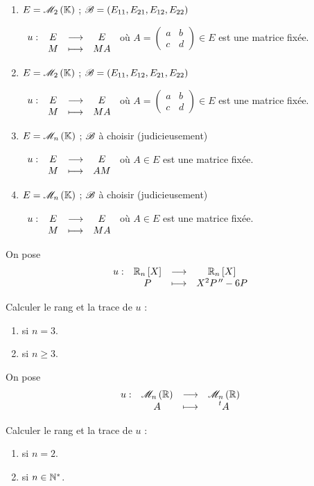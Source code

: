 \begin{exo}
\begin{enumerate}
\item \(E=\M{2}\) ; \(\mathscr{B}=\left(E_{11},E_{21},E_{12},E_{22}\right)\)

\(\begin{array}[t]{cccc}u : & E & \longrightarrow & E \\ & M & \longmapsto & MA\end{array}\) où \(A=\begin{pmatrix}
a & b \\
c & d
\end{pmatrix}\in E\) est une matrice fixée. \\

\item \(E=\M{2}\) ; \(\mathscr{B}=\left(E_{11},E_{12},E_{21},E_{22}\right)\)

\(\begin{array}[t]{cccc}u : & E & \longrightarrow & E \\ & M & \longmapsto & MA\end{array}\) où \(A=\begin{pmatrix}
a & b \\
c & d
\end{pmatrix}\in E\) est une matrice fixée. \\

\item \(E=\M{n}\) ; \(\mathscr{B}\) à choisir (judicieusement)

\(\begin{array}[t]{cccc}u : & E & \longrightarrow & E \\ & M & \longmapsto & AM\end{array}\) où \(A\in E\) est une matrice fixée. \\

\item \(E=\M{n}\) ; \(\mathscr{B}\) à choisir (judicieusement)

\(\begin{array}[t]{cccc}u : & E & \longrightarrow & E \\ & M & \longmapsto & MA\end{array}\) où \(A\in E\) est une matrice fixée.
\end{enumerate}
\end{exo}

\begin{corr}
\end{corr}

\begin{exo}
On pose \[\fonction{u}{\polydeg[\R]{n}}{\polydeg[\R]{n}}{P}{X^2P\seconde-6P}\]

Calculer le rang et la trace de \(u\) :

\begin{enumerate}
\item si \(n=3\). \\

\item si \(n\geq3\).
\end{enumerate}
\end{exo}

\begin{corr}
\end{corr}

\begin{exo}
On pose \[\fonction{u}{\M{n}[\R]}{\M{n}[\R]}{A}{\trans{A}}\]

Calculer le rang et la trace de \(u\) :

\begin{enumerate}
\item si \(n=2\). \\

\item si \(n\in\mathbb{N}^*\).
\end{enumerate}
\end{exo}

